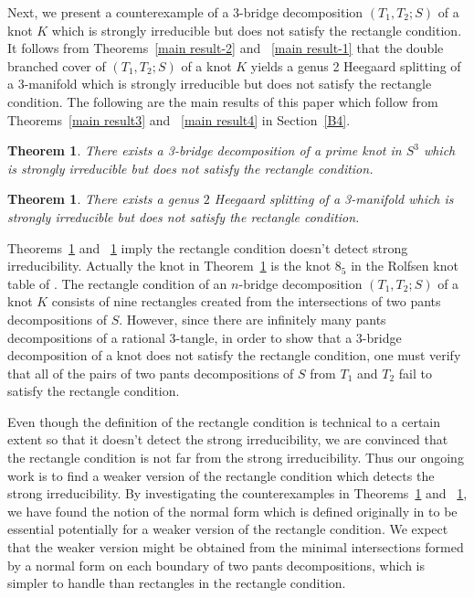 \documentclass[12pt]{amsart}
\newtheorem{Thm}[theorem]{Theorem}
\begin{document}
Next, we present a counterexample of a 3-bridge decomposition $(T_1, T_2; S)$ of a knot $K$ which is strongly irreducible but does not satisfy the rectangle condition.
It follows from Theorems~\ref{main result-2} and ~\ref{main result-1} that the double branched cover of $(T_1, T_2; S)$ of a knot $K$
yields a genus 2 Heegaard splitting of a 3-manifold which is strongly irreducible but does not satisfy the rectangle condition.
The following are the main results of this paper which follow from Theorems~\ref{main result3} and ~\ref{main result4} in Section~\ref{B4}.

\begin{Thm}\label{main result}
There exists a 3-bridge decomposition of a prime knot in $S^3$ which is strongly irreducible but does not satisfy the rectangle condition.
\end{Thm}

\begin{Thm}\label{main result2}
There exists a genus $2$ Heegaard splitting of a 3-manifold which is strongly irreducible but does not satisfy the rectangle condition.
\end{Thm}

Theorems~\ref{main result} and ~\ref{main result2} imply the rectangle condition doesn't detect strong irreducibility.
Actually the knot in Theorem~\ref{main result} is the knot $8_5$ in the Rolfsen knot table of \cite{R76}.
The rectangle condition of an $n$-bridge decomposition $(T_1, T_2;S)$ of a knot $K$ consists of nine rectangles created from the intersections of two pants decompositions of $S$. However, since there are infinitely many pants decompositions of a rational 3-tangle,
in order to show that a 3-bridge decomposition of a knot does not satisfy the rectangle condition, one must verify that all of the pairs of two pants decompositions of $S$ from $T_1$ and $T_2$ fail to satisfy the rectangle condition.

Even though the definition of the rectangle condition is technical to a certain extent so that it doesn't detect the strong irreducibility, we are convinced that the rectangle condition is not far from the strong irreducibility. Thus our ongoing work is to find a weaker version of the rectangle condition which detects the strong irreducibility.
By investigating the counterexamples in Theorems~\ref{main result} and ~\ref{main result2}, we have found the notion of the normal form which is defined originally in \cite{KL24} to be essential potentially for a weaker version of the rectangle condition. We expect that the weaker version might be obtained from the minimal intersections formed by a normal form on each boundary of two pants decompositions, which is simpler to handle than rectangles in the rectangle condition.
\end{document}
